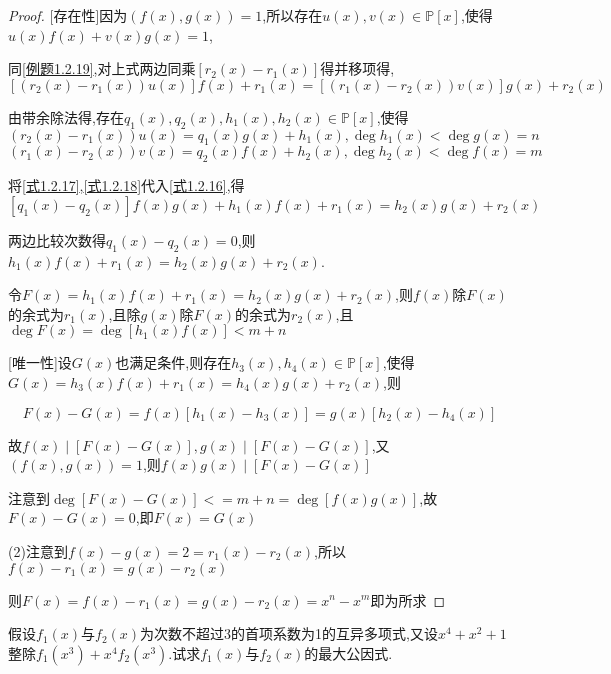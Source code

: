 \begin{proof}

    [存在性]因为$(f(x),g(x))=1$,所以存在$u(x),v(x)\in \mathbb{P}[x]$,使得$u(x)f(x)+v(x)g(x)=1$,

    同\cref{例题1.2.19},对上式两边同乘$[r_2(x)-r_1(x)]$得并移项得,
    \begin{equation}\label{式1.2.16}
        [(r_2(x)-r_1(x))u(x)]f(x)+r_1(x)=[(r_1(x)-r_2(x))v(x)]g(x)+r_2(x)
    \end{equation}

    由带余除法得,存在$q_1(x),q_2(x),h_1(x),h_2(x)\in \mathbb{P}[x]$,使得
    \begin{equation}\label{式1.2.17}
        (r_2(x)-r_1(x))u(x)=q_1(x)g(x)+h_1(x),\deg h_1(x)<\deg g(x)=n
    \end{equation}
    \begin{equation}\label{式1.2.18}
        (r_1(x)-r_2(x))v(x)=q_2(x)f(x)+h_2(x),\deg h_2(x)<\deg f(x)=m
    \end{equation}

    将\cref{式1.2.17},\cref{式1.2.18}代入\cref{式1.2.16},得
    $$[q_1(x)-q_2(x)]f(x)g(x)+h_1(x)f(x)+r_1(x)=h_2(x)g(x)+r_2(x)$$

    两边比较次数得$q_1(x)-q_2(x)=0$,则$h_1(x)f(x)+r_1(x)=h_2(x)g(x)+r_2(x)$. 

    令$F(x)=h_1(x)f(x)+r_1(x)=h_2(x)g(x)+r_2(x)$,则$f(x)$除$F(x)$的余式为$r_1(x)$,且除$g(x)$除$F(x)$的余式为$r_2(x)$,且$\deg F(x)=\deg [h_1(x)f(x)]<m+n$

    [唯一性]设$G(x)$也满足条件,则存在$h_3(x),h_4(x) \in \mathbb{P}[x]$,使得$G(x)=h_3(x)f(x)+r_1(x)=h_4(x)g(x)+r_2(x)$,则

    $$F(x)-G(x)=f(x)[h_1(x)-h_3(x)]=g(x)[h_2(x)-h_4(x)]$$

    故$f(x)\mid [F(x)-G(x)],g(x)\mid [F(x)-G(x)]$,又$(f(x),g(x))=1$,则$f(x)g(x)\mid [F(x)-G(x)]$

    注意到$\deg [F(x)-G(x)]<=m+n=\deg [f(x)g(x)]$,故$F(x)-G(x)=0$,即$F(x)=G(x)$

    (2)注意到$f(x)-g(x)=2=r_1(x)-r_2(x)$,所以$f(x)-r_1(x)=g(x)-r_2(x)$

    则$F(x)=f(x)-r_1(x)=g(x)-r_2(x)=x^n-x^m$即为所求
\end{proof}

\begin{example}
    假设$f_1(x)$与$f_2(x)$为次数不超过3的首项系数为1的互异多项式,又设$x^4+x^2+1$整除$f_1(x^3)+x^4f_2(x^3)$.试求$f_1(x)$与$f_2(x)$的最大公因式.
\end{example}

